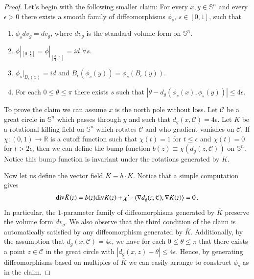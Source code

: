 \documentclass[11pt]{article}
\newcommand{\RR}{\mathds{R}}
\newcommand{\Sn}{\mathds{S}}
\newcommand{\cC}{\mathcal{C}}
\begin{document}
\begin{proof}
Let's begin with the following smaller claim:  For every $x,y\in\Sn^n$ and every $\epsilon>0$ there exists a smooth family of diffeomorphisms $\phi_s$, $s\in [0,1]$, such that
 \begin{enumerate}
 \item $\phi_sdv_g = dv_g$, where $dv_g$ is the standard volume form on $\Sn^n$.
 \item $\phi|_{[0,\frac{1}{4}]} = \phi|_{[\frac{3}{4},1]}=id$ $\forall s$.
 \item $\phi_s|_{B_\epsilon(x)}=id$ and $B_\epsilon(\phi_s(y))=\phi_s(B_\epsilon(y))$.
 \item For each $0\leq\theta\leq\pi$ there exists $s$ such that $|\theta-d_g(\phi_{s}(x),\phi_{s}(y))| \leq 4\epsilon$.
 \end{enumerate}

To prove the claim we can assume $x$ is the north pole without loss.  Let $\cC$ be a great circle in $\Sn^n$ which passes through $y$ and such that $d_g(x,\cC)=4\epsilon$.  Let $K$ be a rotational killing field on $\Sn^n$ which rotates $\cC$ and who gradient vanishes on $\cC$.  If $\chi:(0,1)\to \RR$ is a cutoff function such that $\chi(t)=1$ for $t\leq \epsilon$ and $\chi(t)=0$ for $t>2\epsilon$, then we can define the bump function $b(z)\equiv \chi(d_g(z,\cC))$ on $\Sn^n$.  Notice this bump function is invariant under the rotations generated by $K$.

Now let us define the vector field $\bar K\equiv b\cdot K$.  Notice that a simple computation gives
\begin{align}
{\rm div}\bar K(z) = b(z){\rm div}K(z)+\chi'\cdot\langle\nabla d_g(z,\cC),\nabla K(z)\rangle = 0\, .
\end{align}
In particular, the $1$-parameter family of diffeomorphisms generated by $\bar K$ preserve the volume form $dv_g$.  We also observe that the third condition of the claim is automatically satisfied by any diffeomorphism generated by $\bar K$.  Additionally, by the assumption that $d_g(x,\cC)=4\epsilon$, we have for each $0\leq\theta\leq\pi$ that there exists a point $z\in\cC$ in the great circle with $|d_g(x,z)-\theta|\leq 4\epsilon$.  Hence, by generating diffeomorphisms based on multiples of $\bar K$ we can easily arrange to construct $\phi_s$ as in the claim.


\end{proof}
\end{document}
